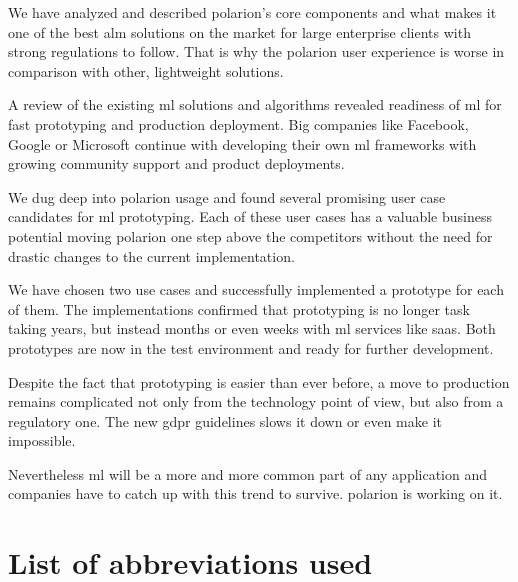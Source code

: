 \documentclass[thesis=M,english]{FITthesis}[2012/06/26]
\begin{document}
\begin{conclusion}
	
We have analyzed and described \acrshort{polarion}'s core components and what makes it one of the best \acrshort{alm} solutions on the market for large enterprise clients with strong regulations to follow. That is why the \acrshort{polarion} user experience is worse in comparison with other, lightweight solutions. 

A review of the existing \acrshort{ml} solutions and algorithms revealed readiness of \acrshort{ml} for fast prototyping and production deployment. Big companies like Facebook, Google or Microsoft continue with developing their own \acrshort{ml} frameworks with growing community support and product deployments.

We dug deep into \acrshort{polarion} usage and found several promising user case candidates for \acrshort{ml} prototyping. Each of these user cases has a valuable business potential moving \acrshort{polarion} one step above the competitors without the need for drastic changes to the current implementation.

We have chosen two use cases and successfully implemented a prototype for each of them. The implementations confirmed that prototyping is no longer task taking years, but instead months or even weeks with \acrshort{ml} services like \acrshort{saas}. Both prototypes are now in the test environment and ready for further development.  

Despite the fact that prototyping is easier than ever before, a move to production remains complicated not only from the technology point of view, but also from a regulatory one. The new \acrshort{gdpr} guidelines slows it down or even make it impossible.

Nevertheless \acrshort{ml} will be a more and more common part of any application and companies have to catch up with this trend to survive. \acrshort{polarion} is working on it.   

\end{conclusion}




\appendix

\chapter{List of abbreviations used}

\printglossaries
\end{document}
